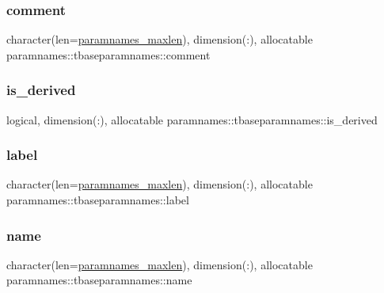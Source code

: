 \subsubsection{\texorpdfstring{comment}{comment}}
{\footnotesize\ttfamily character(len=\mbox{\hyperlink{namespaceparamnames_a4be152acd9c1eea95bdadaf3e5493495}{paramnames\+\_\+maxlen}}), dimension(\+:), allocatable paramnames\+::tbaseparamnames\+::comment\hspace{0.3cm}{\ttfamily [private]}}

\mbox{\label{structparamnames_1_1tbaseparamnames_a3d34f259db7819d0bc3a14ccb647902c}} 
\subsubsection{\texorpdfstring{is\+\_\+derived}{is\_derived}}
{\footnotesize\ttfamily logical, dimension(\+:), allocatable paramnames\+::tbaseparamnames\+::is\+\_\+derived\hspace{0.3cm}{\ttfamily [private]}}

\mbox{\label{structparamnames_1_1tbaseparamnames_a2ee5adb7cfe79ce402c27b4b5e9235fc}} 
\subsubsection{\texorpdfstring{label}{label}}
{\footnotesize\ttfamily character(len=\mbox{\hyperlink{namespaceparamnames_a4be152acd9c1eea95bdadaf3e5493495}{paramnames\+\_\+maxlen}}), dimension(\+:), allocatable paramnames\+::tbaseparamnames\+::label\hspace{0.3cm}{\ttfamily [private]}}

\mbox{\label{structparamnames_1_1tbaseparamnames_a55127999af6fb983d7a9525bf5120cc8}} 
\subsubsection{\texorpdfstring{name}{name}}
{\footnotesize\ttfamily character(len=\mbox{\hyperlink{namespaceparamnames_a4be152acd9c1eea95bdadaf3e5493495}{paramnames\+\_\+maxlen}}), dimension(\+:), allocatable paramnames\+::tbaseparamnames\+::name\hspace{0.3cm}{\ttfamily [private]}}



